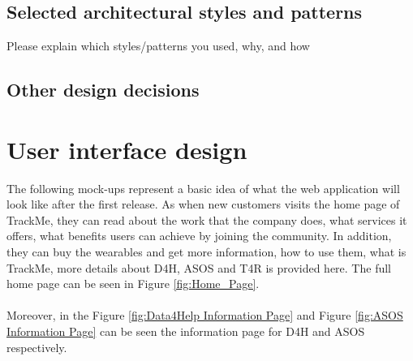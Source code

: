 \documentclass[a4paper, hidelinks, 12pt]{report}
\begin{document}
	\section{Selected architectural styles and patterns}
	Please explain which styles/patterns you
used, why, and how 

	\section{Other design decisions}
	
	\chapter{User interface design}
	The following mock-ups represent a basic idea of what the web application will look like after the first release.
	As when new customers visits the home page of TrackMe, they can read about the work that the company does, what services it offers, what benefits users can achieve by joining the community. In addition, they can buy the wearables and get more information, how to use them, what is TrackMe, more details about D4H, ASOS and T4R is provided here. The full home page can be seen in Figure \ref{fig:Home_Page}. \\\\
	Moreover, in the Figure \ref{fig:Data4Help Information Page} and Figure \ref{fig:ASOS Information Page} can be seen the information page for D4H and ASOS respectively.
	
\end{document}
